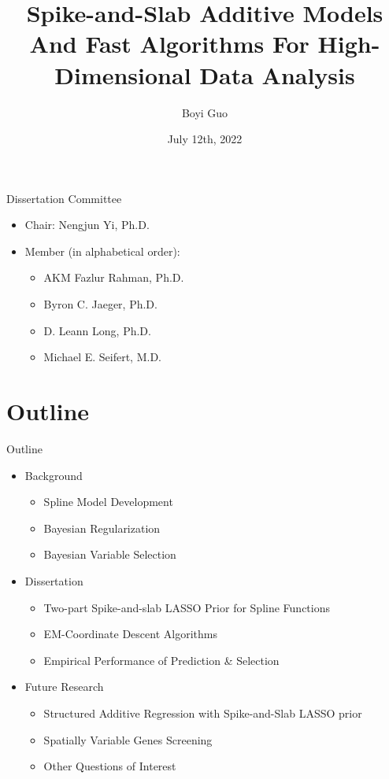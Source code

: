 \documentclass[
  ignorenonframetext,
  aspectratio=169]{beamer}
\title{Spike-and-Slab Additive Models And Fast Algorithms For
High-Dimensional Data Analysis}
\author{Boyi Guo}
\date{July 12th, 2022}
\institute{Department of Biostatistics\\
University of Alabama at Birmingham}
\providecommand{\tightlist}{%
  \setlength{\itemsep}{0pt}\setlength{\parskip}{0pt}}
\begin{document}
\frame{\titlepage}

\begin{frame}{Dissertation Committee}
\protect\hypertarget{dissertation-committee}{}
\begin{itemize}
\tightlist
\item
  Chair: Nengjun Yi, Ph.D.
\item
  Member (in alphabetical order):

  \begin{itemize}
  \tightlist
  \item
    AKM Fazlur Rahman, Ph.D.
  \item
    Byron C. Jaeger, Ph.D.
  \item
    D. Leann Long, Ph.D.
  \item
    Michael E. Seifert, M.D.
  \end{itemize}
\end{itemize}
\end{frame}

\hypertarget{outline}{%
\section*{Outline}\label{outline}}

\begin{frame}{Outline}
\begin{itemize}
\tightlist
\item
  Background

  \begin{itemize}
  \tightlist
  \item
    Spline Model Development
  \item
    Bayesian Regularization
  \item
    Bayesian Variable Selection
  \end{itemize}
\item
  Dissertation

  \begin{itemize}
  \tightlist
  \item
    Two-part Spike-and-slab LASSO Prior for Spline Functions
  \item
    EM-Coordinate Descent Algorithms
  \item
    Empirical Performance of Prediction \& Selection
  \end{itemize}
\item
  Future Research

  \begin{itemize}
  \tightlist
  \item
    Structured Additive Regression with Spike-and-Slab LASSO prior
  \item
    Spatially Variable Genes Screening
  \item
    Other Questions of Interest
  \end{itemize}
\end{itemize}
\end{frame}
\end{document}
